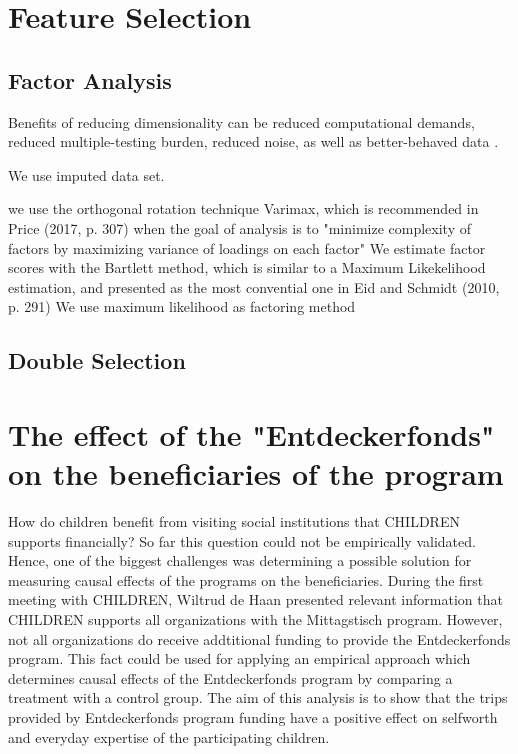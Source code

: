 \documentclass[12pt, a4paper, titlepage]{article}\usepackage[]{graphicx}\usepackage[]{color}
\begin{document}
\section{Feature Selection}

\subsection{Factor Analysis}

Benefits of reducing dimensionality can be reduced computational demands, reduced multiple-testing burden, reduced noise, as well as better-behaved data \cite{Millenstein.2020, p.677}.

We use imputed data set.

we use the orthogonal rotation technique Varimax, which is recommended in Price (2017, p. 307) when the goal of analysis is to "minimize complexity of factors by maximizing variance of loadings on each factor" 
We estimate factor scores with the Bartlett method, which is similar to a Maximum Likekelihood estimation, and presented as the most convential one in Eid and Schmidt (2010, p. 291)
We use maximum likelihood as factoring method

\subsection{Double Selection}

\section{The effect of the "Entdeckerfonds" on the beneficiaries of the program}

How do children benefit from visiting social institutions that CHILDREN supports financially? So far this question could not be empirically validated. Hence, one of the biggest challenges was determining a possible solution for measuring causal effects of the programs on the beneficiaries. During the first meeting with CHILDREN, Wiltrud de Haan presented relevant information that CHILDREN supports all organizations with the Mittagstisch program. However, not all organizations do receive addtitional funding to provide the Entdeckerfonds program. This fact could be used for applying an empirical approach which determines causal effects of the Entdeckerfonds program by comparing a treatment with a control group. The aim of this analysis is to show that the trips provided by Entdeckerfonds program funding have a positive effect on selfworth and everyday expertise of the participating children. 
\end{document}
